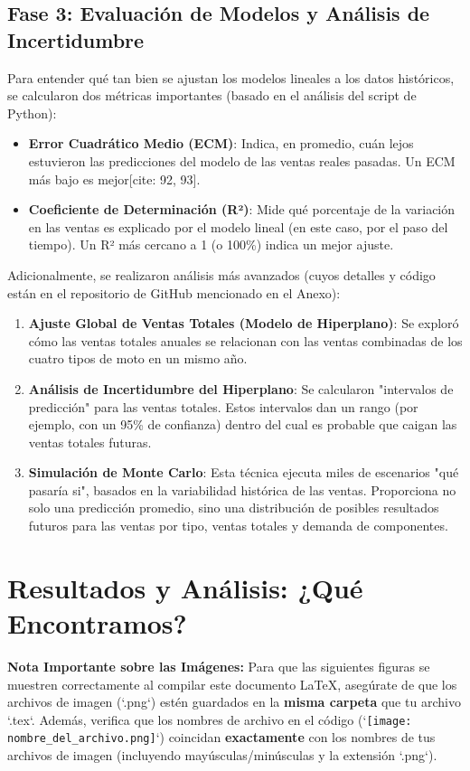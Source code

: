 \documentclass[12pt,a4paper]{article}
\begin{document}
\subsection{Fase 3: Evaluación de Modelos y Análisis de Incertidumbre}
Para entender qué tan bien se ajustan los modelos lineales a los datos históricos, se calcularon dos métricas importantes (basado en el análisis del script de Python):
\begin{itemize}
    \item \textbf{Error Cuadrático Medio (ECM)}: Indica, en promedio, cuán lejos estuvieron las predicciones del modelo de las ventas reales pasadas. Un ECM más bajo es mejor[cite: 92, 93].
    \item \textbf{Coeficiente de Determinación (R²)}: Mide qué porcentaje de la variación en las ventas es explicado por el modelo lineal (en este caso, por el paso del tiempo). Un R² más cercano a 1 (o 100\%) indica un mejor ajuste.
\end{itemize}
Adicionalmente, se realizaron análisis más avanzados (cuyos detalles y código están en el repositorio de GitHub mencionado en el Anexo):
\begin{enumerate}
    \item \textbf{Ajuste Global de Ventas Totales (Modelo de Hiperplano)}: Se exploró cómo las ventas totales anuales se relacionan con las ventas combinadas de los cuatro tipos de moto en un mismo año.
    \item \textbf{Análisis de Incertidumbre del Hiperplano}: Se calcularon "intervalos de predicción" para las ventas totales. Estos intervalos dan un rango (por ejemplo, con un 95\% de confianza) dentro del cual es probable que caigan las ventas totales futuras.
    \item \textbf{Simulación de Monte Carlo}: Esta técnica ejecuta miles de escenarios "qué pasaría si", basados en la variabilidad histórica de las ventas. Proporciona no solo una predicción promedio, sino una distribución de posibles resultados futuros para las ventas por tipo, ventas totales y demanda de componentes.
\end{enumerate}

\newpage %
\section{Resultados y Análisis: ¿Qué Encontramos?}

\noindent\textbf{Nota Importante sobre las Imágenes:} Para que las siguientes figuras se muestren correctamente al compilar este documento LaTeX, asegúrate de que los archivos de imagen (`.png`) estén guardados en la \textbf{misma carpeta} que tu archivo `.tex`. Además, verifica que los nombres de archivo en el código (`\texttt{[image: nombre\_del\_archivo.png]}`) coincidan \textbf{exactamente} con los nombres de tus archivos de imagen (incluyendo mayúsculas/minúsculas y la extensión `.png`).
\end{document}
